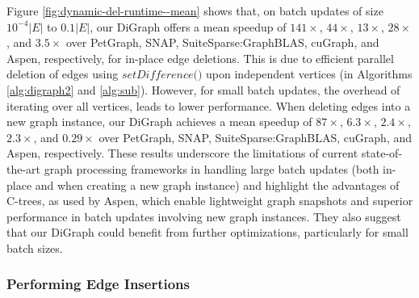 

Figure \ref{fig:dynamic-del-runtime--mean} shows that, on batch updates of size $10^{-4}|E|$ to $0.1|E|$, our DiGraph offers a mean speedup of $141\times$, $44\times$, $13\times$, $28\times$, and $3.5\times$ over PetGraph, SNAP, SuiteSparse:GraphBLAS, cuGraph, and Aspen, respectively, for in-place edge deletions. This is due to efficient parallel deletion of edges using $\textit{setDifference()}$ upon independent vertices (in Algorithms \ref{alg:digraph2} and \ref{alg:sub}). However, for small batch updates, the overhead of iterating over all vertices, leads to lower performance. When deleting edges into a new graph instance, our DiGraph achieves a mean speedup of $87\times$, $6.3\times$, $2.4\times$, $2.3\times$, and $0.29\times$ over PetGraph, SNAP, SuiteSparse:GraphBLAS, cuGraph, and Aspen, respectively. These results underscore the limitations of current state-of-the-art graph processing frameworks in handling large batch updates (both in-place and when creating a new graph instance) and highlight the advantages of C-trees, as used by Aspen, which enable lightweight graph snapshots and superior performance in batch updates involving new graph instances. They also suggest that our DiGraph could benefit from further optimizations, particularly for small batch sizes.


\subsubsection{Performing Edge Insertions}

